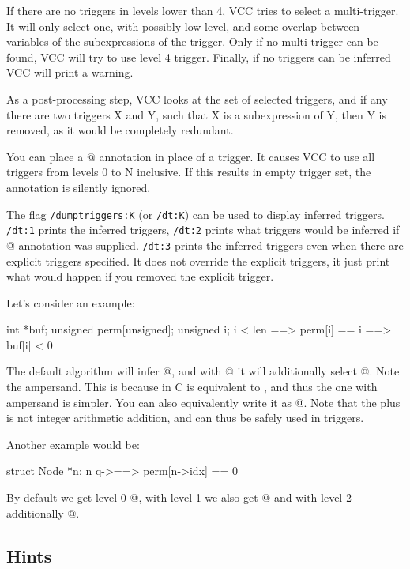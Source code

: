 If there are no triggers in levels lower than 4, VCC tries to select a multi-trigger.
It will only select one, with possibly low level, and some overlap between variables
of the subexpressions of the trigger.
Only if no multi-trigger can be found, VCC will try to use level 4 trigger.
Finally, if no triggers can be inferred VCC will print a warning.

As a post-processing step, VCC looks at the set of selected triggers, and if
any there are two triggers X and Y, such that X is a subexpression of Y, then Y
is removed, as it would be completely redundant.

You can place a @ annotation in place of a trigger.
It causes VCC to use all triggers from levels 0 to N inclusive.
If this results in empty trigger set, the annotation is silently ignored.

The flag \texttt{/dumptriggers:K} (or \texttt{/dt:K}) can be used to display inferred
triggers.
\texttt{/dt:1} prints the inferred triggers,
\texttt{/dt:2} prints what triggers would be inferred if @ annotation
was supplied.
\texttt{/dt:3} prints the inferred triggers even when there are explicit triggers
specified. 
It does not override the explicit triggers, it just print what would happen if you
removed the explicit trigger.

Let's consider an example:
\begin{VCC}
int *buf;
unsigned perm[unsigned];
\forall unsigned i; i < len ==> perm[i] == i ==> buf[i] < 0
\end{VCC}
The default algorithm will infer @, and with @
it will additionally select @.
Note the ampersand.
This is because in C  is equivalent to , and thus
the one with ampersand is simpler.
You can also equivalently write it as @.
Note that the plus is not integer arithmetic addition, and can thus be safely used
in triggers.

Another example would be:
\begin{VCC}
\forall struct Node *n; n \in q->\owns ==> perm[n->idx] == 0
\end{VCC}
By default we get level 0 @, with level 1 we also get
@ and with level 2 additionally @.

\subsection{Hints}
\label{sect:trigger-hints}

